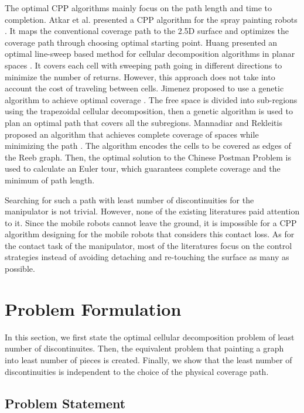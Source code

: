 \documentclass[journal]{IEEEtran}
\begin{document}
The optimal CPP algorithms mainly focus on the path length and time to completion.
Atkar et al. presented a CPP algorithm for the spray painting robots \cite{Atkar2003Towards}. It maps the conventional coverage path to the 2.5D surface and optimizes the coverage path through choosing optimal starting point. 
Huang presented an optimal line-sweep based method for cellular decomposition algorithms in planar spaces \cite{huang2001optimal}. It covers each cell with sweeping path going in different directions to minimize the number of returns. However, this approach does not take into account the cost of traveling between cells. 
Jimenez proposed to use a genetic algorithm to achieve optimal coverage \cite{jimenez2007optimal}. The free space is divided into sub-regions using the trapezoidal cellular decomposition, then a genetic algorithm is used to plan an optimal path that covers all the subregions.  
Mannadiar and Rekleitis proposed an algorithm that achieves complete coverage of spaces while minimizing the path \cite{mannadiar2010optimal}. The algorithm encodes the cells to be covered as edges of the Reeb graph. Then, the optimal solution to the Chinese Postman Problem is used to calculate an Euler tour, which guarantees complete coverage and the minimum of path length. 

Searching for such a path with least number of discontinuities  for the manipulator is not trivial. However, none of the existing literatures paid attention to it. 
Since the mobile robots cannot leave the ground, it is impossible for a CPP algorithm designing for the mobile robots that considers this contact loss. As for the contact task of the manipulator, most of the literatures \cite{solanes2018adaptive} \cite{solanes2019robust} focus on the control strategies instead of avoiding detaching and re-touching the surface as many as possible. 



\section{Problem Formulation}\label{sectionproblemformulation}
In this section, we first state the optimal cellular decomposition problem of least number of discontinuites. Then, the equivalent problem that painting a graph into least number of pieces is created. Finally, we show that the least number of discontinuities is independent to the choice of the physical coverage path. 



\subsection{Problem Statement}
\end{document}
